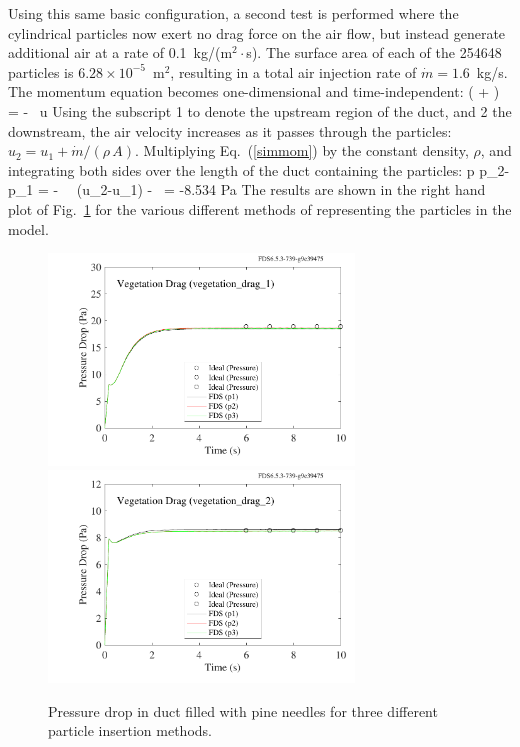 \documentclass[11pt]{book}
\begin{document}
Using this same basic configuration, a second test is performed where the cylindrical particles now exert no drag force on the air flow, but instead generate additional air at a rate of 0.1~kg/(m$^2 \cdot$s). The surface area of each of the 254648 particles is $6.28 \times 10^{-5}$~m$^2$, resulting in a total air injection rate of $\dot{m}=1.6$~kg/s. The momentum equation becomes one-dimensional and time-independent:
\be
    \left(  +  \right) = -   \, u  \label{simmom}
\ee
Using the subscript 1 to denote the upstream region of the duct, and 2 the downstream, the air velocity increases as it passes through the particles: $u_2=u_1+\dot{m}/(\rho \, A)$. Multiplying Eq.~(\ref{simmom}) by the constant density, $\rho$, and integrating both sides over the length of the duct containing the particles:
\be
   \Delta p \equiv p_2-p_1 =  - \rho \,  \, (u_2-u_1) -  \,  = -8.534  \; {\rm Pa}
\ee
The results are shown in the right hand plot of Fig.~\ref{vegetation_drag_fig} for the various different methods of representing the particles in the model.

\begin{figure}[ht]
\includegraphics[width=3.2in]{SCRIPT_FIGURES/vegetation_drag_1}
\includegraphics[width=3.2in]{SCRIPT_FIGURES/vegetation_drag_2}
\caption[The {\ct vegetation\_drag} test cases]{Pressure drop in duct filled with pine needles for three different particle insertion methods.}
\label{vegetation_drag_fig}
\end{figure}
\end{document}
